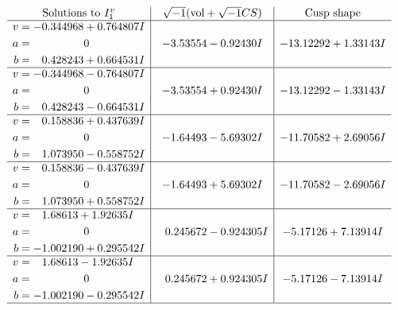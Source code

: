 \documentclass[1p]{elsarticle_modified}
\theoremstyle{definition}
\newcommand{\I}{\sqrt{-1}}
\begin{document}
$$\begin{array}{c|c|c}  
\text{Solutions to }I^v_{1}& \I (\text{vol} + \sqrt{-1}CS) & \text{Cusp shape}\\
 \hline 
\begin{aligned}
v &= -0.344968 + 0.764807 I \\
a &= \phantom{-0.000000 } 0 \\
b &= \phantom{-}0.428243 + 0.664531 I\end{aligned}
 & -3.53554 - 0.92430 I & -13.12292 + 1.33143 I \\ \hline\begin{aligned}
v &= -0.344968 - 0.764807 I \\
a &= \phantom{-0.000000 } 0 \\
b &= \phantom{-}0.428243 - 0.664531 I\end{aligned}
 & -3.53554 + 0.92430 I & -13.12292 - 1.33143 I \\ \hline\begin{aligned}
v &= \phantom{-}0.158836 + 0.437639 I \\
a &= \phantom{-0.000000 } 0 \\
b &= \phantom{-}1.073950 - 0.558752 I\end{aligned}
 & -1.64493 - 5.69302 I & -11.70582 + 2.69056 I \\ \hline\begin{aligned}
v &= \phantom{-}0.158836 - 0.437639 I \\
a &= \phantom{-0.000000 } 0 \\
b &= \phantom{-}1.073950 + 0.558752 I\end{aligned}
 & -1.64493 + 5.69302 I & -11.70582 - 2.69056 I \\ \hline\begin{aligned}
v &= \phantom{-}1.68613 + 1.92635 I \\
a &= \phantom{-0.000000 } 0 \\
b &= -1.002190 + 0.295542 I\end{aligned}
 & \phantom{-}0.245672 - 0.924305 I & -5.17126 + 7.13914 I \\ \hline\begin{aligned}
v &= \phantom{-}1.68613 - 1.92635 I \\
a &= \phantom{-0.000000 } 0 \\
b &= -1.002190 - 0.295542 I\end{aligned}
 & \phantom{-}0.245672 + 0.924305 I & -5.17126 - 7.13914 I\\
 \hline 
 \end{array}$$\newpage
\end{document}
